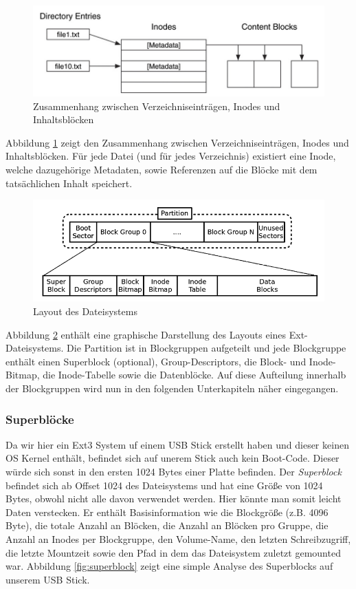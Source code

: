 \begin{figure}[H]
	\centering
	\includegraphics[width=12cm,keepaspectratio=true]{pictures/ext1.png}
	\caption{
		Zusammenhang zwischen Verzeichniseinträgen, Inodes und Inhaltsblöcken \cite{Carrier.06.01.2022}
	}
	\label{fig:ext1}
\end{figure}

Abbildung \ref{fig:ext1} zeigt den Zusammenhang zwischen Verzeichniseinträgen, Inodes und Inhaltsblöcken. Für jede Datei (und für jedes Verzeichnis) existiert eine Inode, welche dazugehörige Metadaten, sowie Referenzen auf die Blöcke mit dem tatsächlichen Inhalt speichert.

\begin{figure}[H]
	\centering
	\includegraphics[width=12cm,keepaspectratio=true]{pictures/layout.png}
	\caption{
		Layout des Dateisystems \cite{AnalysisExt4.07.01.2022}
	}
	\label{fig:layout}
\end{figure}

Abbildung \ref{fig:layout} enthält eine graphische Darstellung des Layouts eines Ext-Dateisystems. Die Partition ist in Blockgruppen aufgeteilt und jede Blockgruppe enthält einen Superblock (optional), Group-Descriptors, die Block- und Inode-Bitmap, die Inode-Tabelle sowie die Datenblöcke. Auf diese Aufteilung innerhalb der Blockgruppen wird nun in den folgenden Unterkapiteln näher eingegangen.

\subsubsection{Superblöcke}

Da wir hier ein Ext3 System uf einem USB Stick erstellt haben und dieser keinen OS Kernel enthält, befindet sich auf unerem Stick auch kein Boot-Code. Dieser würde sich sonst in den ersten 1024 Bytes einer Platte befinden. Der \textit{Superblock} befindet sich ab Offset 1024 des Dateisystems und hat eine Größe von 1024 Bytes, obwohl nicht alle davon verwendet werden. Hier könnte man somit leicht Daten verstecken. Er enthält Basisinformation wie die Blockgröße (z.B. 4096 Byte), die totale Anzahl an Blöcken, die Anzahl an Blöcken pro Gruppe, die Anzahl an Inodes per Blockgruppe, den Volume-Name, den letzten Schreibzugriff, die letzte Mountzeit sowie den Pfad in dem das Dateisystem zuletzt gemounted war. Abbildung \ref{fig:superblock} zeigt eine simple Analyse des Superblocks auf unserem USB Stick.

